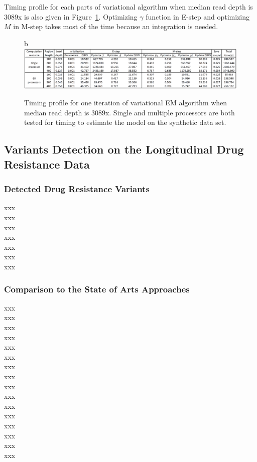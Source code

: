 \documentclass{article}
\begin{document}
Timing profile for each parts of variational algorithm when median read depth is 3089x is also given in Figure~\ref{tbl:timing_profile_all}.
Optimizing $\gamma$ function in E-step and optimizing $M$ in M-step takes most of the time because an integration is needed.

\begin{figure}{b}
\centering
\includegraphics[width=1.0\textwidth]{tables/time_3089X_all.png}
\caption{Timing profile for one iteration of variational EM algorithm when median read depth is 3089x.
Single and multiple processors are both tested for timing to estimate the model on the synthetic data set.}
\label{tbl:timing_profile_all}
\end{figure}

\subsection{Variants Detection on the Longitudinal Drug Resistance Data}
\subsubsection{Detected Drug Resistance Variants}
xxx\\
xxx\\
xxx\\
xxx\\
xxx\\
xxx\\
xxx\\


\subsubsection{Comparison to the State of Arts Approaches}
xxx\\
xxx\\
xxx\\
xxx\\
xxx\\
xxx\\
xxx\\
xxx\\
xxx\\
xxx\\
xxx\\
xxx\\
xxx\\
xxx\\
xxx\\
xxx\\
\end{document}
